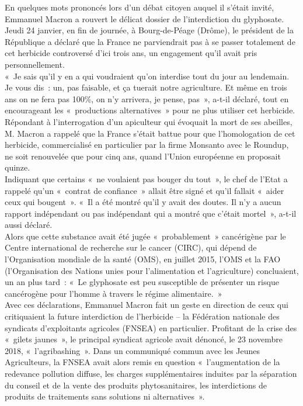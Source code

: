 \documentclass[8pt]{article}
\begin{document}
En quelques mots prononcés lors d’un débat citoyen auquel il s’était invité, Emmanuel Macron a rouvert le délicat dossier de l’interdiction du glyphosate. Jeudi 24 janvier, en fin de journée, à Bourg-de-Péage (Drôme), le président de la République a déclaré que la France ne parviendrait pas à se passer totalement de cet herbicide controversé d’ici trois ans, un engagement qu’il avait pris personnellement.\\

«~Je sais qu’il y en a qui voudraient qu’on interdise tout du jour au lendemain. Je vous dis~: un, pas faisable, et ça tuerait notre agriculture. Et même en trois ans on ne fera pas 100\%, on n’y arrivera, je pense, pas~», a-t-il déclaré, tout en encourageant les «~productions alternatives~» pour ne plus utiliser cet herbicide. Répondant à l’interrogation d’un apiculteur qui évoquait la mort de ses abeilles, M. Macron a rappelé que la France s’était battue pour que l’homologation de cet herbicide, commercialisé en particulier par la firme Monsanto avec le Roundup, ne soit renouvelée que pour cinq ans, quand l’Union européenne en proposait quinze.\\

Indiquant que certains «~ne voulaient pas bouger du tout~», le chef de l’Etat a rappelé qu’un «~contrat de confiance~» allait être signé et qu’il fallait «~aider ceux qui bougent~». «~Il a été montré qu’il y avait des doutes. Il n’y a aucun rapport indépendant ou pas indépendant qui a montré que c’était mortel~», a-t-il aussi déclaré.\\

Alors que cette substance avait été jugée «~probablement~» cancérigène par le Centre international de recherche sur le cancer (CIRC), qui dépend de l’Organisation mondiale de la santé (OMS), en juillet 2015, l’OMS et la FAO (l’Organisation des Nations unies pour l’alimentation et l’agriculture) concluaient, un an plus tard~: «~Le glyphosate est peu susceptible de présenter un risque cancérogène pour l’homme à travers le régime alimentaire.~»\\

Avec ces déclarations, Emmanuel Macron fait un geste en direction de ceux qui critiquaient la future interdiction de l’herbicide – la Fédération nationale des syndicats d’exploitants agricoles (FNSEA) en particulier. Profitant de la crise des «~gilets jaunes~», le principal syndicat agricole avait dénoncé, le 23 novembre 2018, «~l’agribashing~». Dans un communiqué commun avec les Jeunes Agriculteurs, la FNSEA avait alors remis en question «~l’augmentation de la redevance pollution diffuse, les charges supplémentaires induites par la séparation du conseil et de la vente des produits phytosanitaires, les interdictions de produits de traitements sans solutions ni alternatives~».\\
\end{document}
